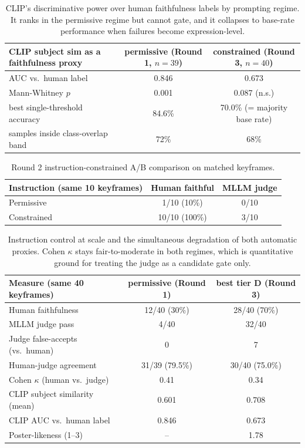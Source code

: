 \begin{table}[htbp]
\centering
\small
\begin{tabular}{lcc}
\toprule
CLIP subject sim as a faithfulness proxy & permissive (Round 1, $n=39$) & constrained (Round 3, $n=40$) \\
\midrule
AUC vs.\ human label & 0.846 & 0.673 \\
Mann-Whitney $p$ & 0.001 & 0.087 (n.s.) \\
best single-threshold accuracy & 84.6\% & 70.0\% (= majority base rate) \\
samples inside class-overlap band & 72\% & 68\% \\
\bottomrule
\end{tabular}
\caption{CLIP's discriminative power over human faithfulness labels by prompting regime. It ranks in the permissive regime but cannot gate, and it collapses to base-rate performance when failures become expression-level.}
\label{tab:clipregime}
\end{table}

\begin{table}[htbp]
\centering
\small
\begin{tabular}{lcc}
\toprule
Instruction (same 10 keyframes) & Human faithful & MLLM judge \\
\midrule
Permissive & 1/10 (10\%) & 0/10 \\
Constrained & 10/10 (100\%) & 3/10 \\
\bottomrule
\end{tabular}
\caption{Round 2 instruction-constrained A/B comparison on matched keyframes.}
\label{tab:ab10}
\end{table}

\begin{table}[htbp]
\centering
\small
\begin{tabular}{lcc}
\toprule
Measure (same 40 keyframes) & permissive (Round 1) & best tier D (Round 3) \\
\midrule
Human faithfulness & 12/40 (30\%) & 28/40 (70\%) \\
MLLM judge pass & 4/40 & 32/40 \\
Judge false-accepts (vs.\ human) & 0 & 7 \\
Human-judge agreement & 31/39 (79.5\%) & 30/40 (75.0\%) \\
Cohen $\kappa$ (human vs.\ judge) & 0.41 & 0.34 \\
CLIP subject similarity (mean) & 0.601 & 0.708 \\
CLIP AUC vs.\ human label & 0.846 & 0.673 \\
Poster-likeness (1--3) & -- & 1.78 \\
\bottomrule
\end{tabular}
\caption{Instruction control at scale and the simultaneous degradation of both automatic proxies. Cohen $\kappa$ stays fair-to-moderate in both regimes, which is quantitative ground for treating the judge as a candidate gate only.}
\label{tab:rounds}
\end{table}

